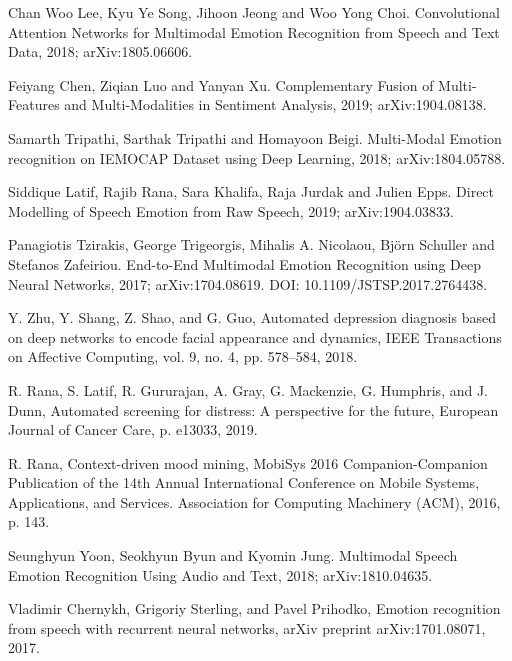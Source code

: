 \documentclass{article}
\begin{document}
\begin{thebibliography}{1}

Chan Woo Lee, Kyu Ye Song, Jihoon Jeong and Woo Yong Choi.
\newblock Convolutional Attention Networks for Multimodal Emotion Recognition from Speech and Text Data, 2018;
\newblock arXiv:1805.06606.

Feiyang Chen, Ziqian Luo and Yanyan Xu.
\newblock Complementary Fusion of Multi-Features and Multi-Modalities in Sentiment Analysis, 2019;
\newblock arXiv:1904.08138.

Samarth Tripathi, Sarthak Tripathi and Homayoon Beigi.
\newblock Multi-Modal Emotion recognition on IEMOCAP Dataset using Deep Learning, 2018;
\newblock arXiv:1804.05788.

Siddique Latif, Rajib Rana, Sara Khalifa, Raja Jurdak and Julien Epps.
\newblock Direct Modelling of Speech Emotion from Raw Speech, 2019;
\newblock arXiv:1904.03833.

Panagiotis Tzirakis, George Trigeorgis, Mihalis A. Nicolaou, Björn Schuller and Stefanos Zafeiriou.
\newblock End-to-End Multimodal Emotion Recognition using Deep Neural Networks, 2017;
\newblock arXiv:1704.08619.
\newblock DOI: 10.1109/JSTSP.2017.2764438.

Y. Zhu, Y. Shang, Z. Shao, and G. Guo, 
\newblock Automated depression diagnosis based on deep networks to encode facial appearance and dynamics,
\newblock IEEE Transactions on Affective Computing, vol. 9, no. 4, pp. 578–584, 2018.

R. Rana, S. Latif, R. Gururajan, A. Gray, G. Mackenzie, G. Humphris, and J. Dunn, 
\newblock Automated screening for distress: A perspective for the future,
\newblock European Journal of Cancer Care, p. e13033, 2019. 

R. Rana, 
\newblock Context-driven mood mining,
\newblock MobiSys 2016 Companion-Companion Publication of the 14th Annual International Conference on Mobile Systems, Applications, and Services. Association for Computing Machinery (ACM), 2016, p. 143.

Seunghyun Yoon, Seokhyun Byun and Kyomin Jung.
\newblock Multimodal Speech Emotion Recognition Using Audio and Text, 2018;
\newblock arXiv:1810.04635.

Vladimir Chernykh, Grigoriy Sterling, and Pavel Prihodko,
\newblock Emotion recognition from speech with recurrent neural networks,
\newblock arXiv preprint arXiv:1701.08071, 2017.


\end{thebibliography}
\end{document}
